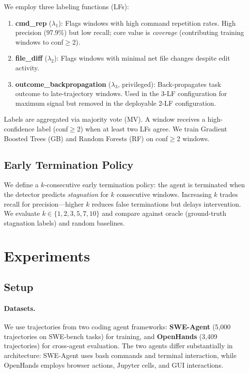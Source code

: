 \documentclass[11pt,a4paper]{article}
\begin{document}
We employ three labeling functions (LFs):

\begin{enumerate}[leftmargin=*,itemsep=1pt]
\item \textbf{cmd\_rep} ($\lambda_1$): Flags windows with high command repetition rates.
High precision (97.9\%) but low recall; core value is \emph{coverage} (contributing training windows to conf$\geq$2).
\item \textbf{file\_diff} ($\lambda_2$): Flags windows with minimal net file changes despite edit activity.
\item \textbf{outcome\_backpropagation} ($\lambda_3$, privileged): Back-propagates task outcome to late-trajectory windows.
Used in the 3-LF configuration for maximum signal but removed in the deployable 2-LF configuration.
\end{enumerate}

\noindent Labels are aggregated via majority vote (MV).
A window receives a high-confidence label (conf$\geq$2) when at least two LFs agree.
We train Gradient Boosted Trees (GB) and Random Forests (RF) on conf$\geq$2 windows.

\subsection{Early Termination Policy}
\label{sec:et-policy}

We define a $k$-consecutive early termination policy: the agent is terminated when the detector predicts \emph{stagnation} for $k$ consecutive windows.
Increasing $k$ trades recall for precision---higher $k$ reduces false terminations but delays intervention.
We evaluate $k \in \{1, 2, 3, 5, 7, 10\}$ and compare against oracle (ground-truth stagnation labels) and random baselines.

\section{Experiments}

\subsection{Setup}

\paragraph{Datasets.}
We use trajectories from two coding agent frameworks:
\textbf{SWE-Agent} (5{,}000 trajectories on SWE-bench tasks) for training, and
\textbf{OpenHands} (3{,}409 trajectories) for cross-agent evaluation.
The two agents differ substantially in architecture: SWE-Agent uses bash commands and terminal interaction, while OpenHands employs browser actions, Jupyter cells, and GUI interactions.
\end{document}
